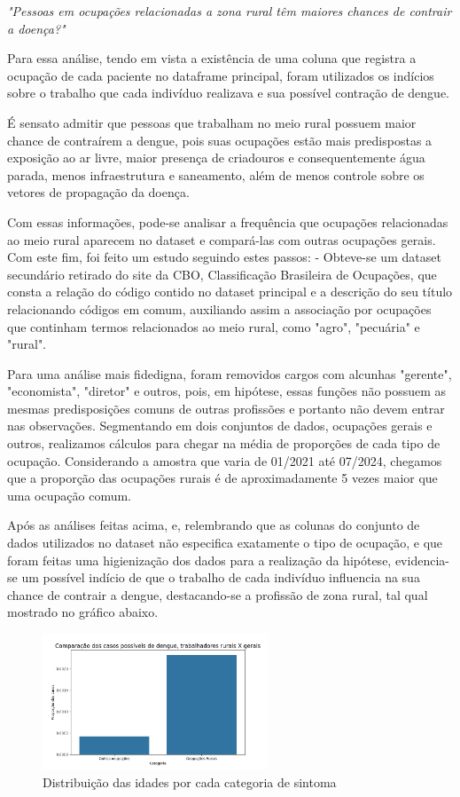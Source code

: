\documentclass[a4paper, 12pt, twoside]{article}
\begin{document}
\emph{"Pessoas em ocupações relacionadas a zona rural têm maiores chances de contrair a doença?"}

Para essa análise, tendo em vista a existência de uma coluna que registra a ocupação de cada paciente no dataframe principal, foram utilizados os indícios sobre o trabalho que cada indivíduo realizava e sua possível contração de dengue. 

É sensato admitir que pessoas que trabalham no meio rural possuem maior chance de contraírem a dengue, pois suas ocupações estão mais predispostas a exposição ao ar livre, maior presença de criadouros e consequentemente água parada, menos infraestrutura e saneamento, além de menos controle sobre os vetores de propagação da doença.

Com essas informações, pode-se analisar a frequência que ocupações relacionadas ao meio rural aparecem no dataset e compará-las com outras ocupações gerais. Com este fim, foi feito um estudo seguindo estes passos: 
-  Obteve-se um dataset secundário retirado do site da CBO, Classificação Brasileira de Ocupações, que consta a relação do código contido no dataset principal e a descrição do seu título relacionando códigos em comum, auxiliando assim a associação por ocupações que continham termos relacionados ao meio rural, como "agro", "pecuária" e "rural".

Para uma análise mais fidedigna, foram removidos cargos com alcunhas "gerente", "economista", "diretor" e outros, pois, em hipótese, essas funções não possuem as mesmas predisposições comuns de outras profissões e portanto não devem entrar nas observações. Segmentando em dois conjuntos de dados, ocupações gerais e outros, realizamos cálculos para chegar na média de proporções de cada tipo de ocupação. Considerando a amostra que varia de 01/2021 até 07/2024, chegamos que a proporção das ocupações rurais é de aproximadamente 5 vezes maior que uma ocupação comum. 

Após as análises feitas acima, e, relembrando que as colunas do conjunto de dados utilizados no dataset não especifica exatamente o tipo de ocupação, e que foram feitas uma higienização dos dados para a realização da hipótese, evidencia-se um possível indício de que o trabalho de cada indivíduo influencia na sua chance de contrair a dengue, destacando-se a profissão de zona rural, tal qual mostrado no gráfico abaixo.

\begin{figure}[H]
    \centering
    \includegraphics[width=0.6\textwidth]{images/plot_hp4.png}
    \caption{Distribuição das idades por cada categoria de sintoma}
    \label{fig:occupation}
\end{figure}
\end{document}
